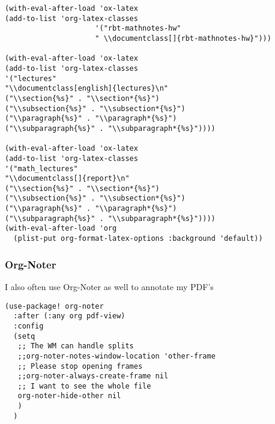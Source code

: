 \documentclass[11pt]{article}
\begin{document}
\begin{verbatim}
(with-eval-after-load 'ox-latex
(add-to-list 'org-latex-classes
                     '("rbt-mathnotes-hw"
                     " \\documentclass[]{rbt-mathnotes-hw}")))

(with-eval-after-load 'ox-latex
(add-to-list 'org-latex-classes
'("lectures"
"\\documentclass[english]{lectures}\n"
("\\section{%s}" . "\\section*{%s}")
("\\subsection{%s}" . "\\subsection*{%s}")
("\\paragraph{%s}" . "\\paragraph*{%s}")
("\\subparagraph{%s}" . "\\subparagraph*{%s}"))))

(with-eval-after-load 'ox-latex
(add-to-list 'org-latex-classes
'("math_lectures"
"\\documentclass[]{report}\n"
("\\section{%s}" . "\\section*{%s}")
("\\subsection{%s}" . "\\subsection*{%s}")
("\\paragraph{%s}" . "\\paragraph*{%s}")
("\\subparagraph{%s}" . "\\subparagraph*{%s}"))))
(with-eval-after-load 'org
  (plist-put org-format-latex-options :background 'default))

\end{verbatim}

\subsubsection{Org-Noter}
\label{sec:org79717a6}
I also often use Org-Noter as well to annotate my PDF's
\begin{verbatim}
(use-package! org-noter
  :after (:any org pdf-view)
  :config
  (setq
   ;; The WM can handle splits
   ;;org-noter-notes-window-location 'other-frame
   ;; Please stop opening frames
   ;;org-noter-always-create-frame nil
   ;; I want to see the whole file
   org-noter-hide-other nil
   )
  )
\end{verbatim}
\end{document}
